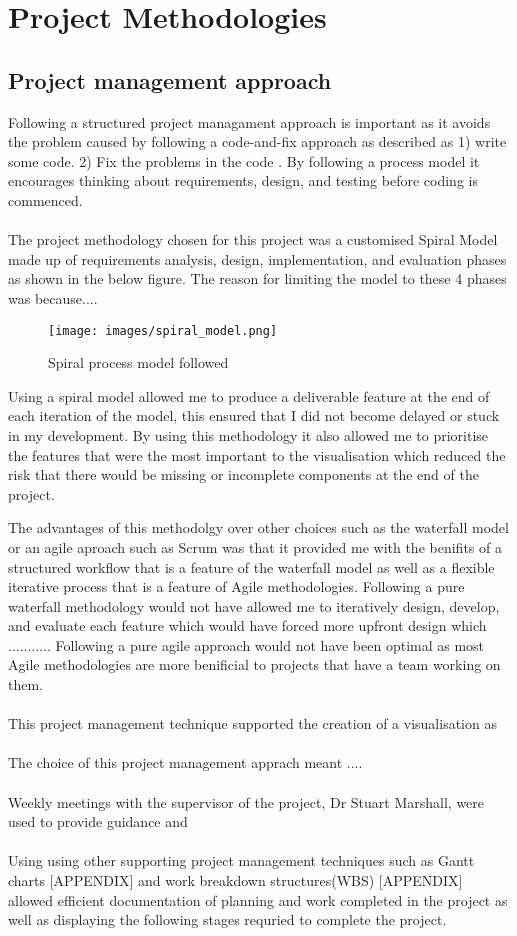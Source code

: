 
\chapter{Project Methodologies}\label{C:m}

\section{Project management approach}
Following a structured project managament approach is important as it avoids the problem caused by following a code-and-fix approach as described  as 1) write some code. 2) Fix the problems in the code \cite{boehm}. By following a process model it encourages thinking about requirements, design, and testing before coding is commenced. 
\\\\
The project methodology chosen for this project was a customised Spiral Model made up of requirements analysis, design, implementation, and evaluation phases as shown in the below figure. The reason for limiting the model to these 4 phases was because....  
\begin{figure}[h!]
  \centering
      \texttt{[image: images/spiral\_model.png]}
  \caption{Spiral process model followed}
\end{figure}
Using a spiral model allowed me to produce a deliverable feature at the end of each iteration of the model, this ensured that I did not become delayed or stuck in my development. By using this methodology it also allowed me to prioritise the features that were the most important to the visualisation which reduced the risk that there would be missing or incomplete components at the end of the project. 

The advantages of this methodolgy over other choices such as the waterfall model or an agile aproach such as Scrum was that it provided me with the benifits of a structured workflow that is a feature of the waterfall model as well as a flexible iterative process that is a feature of Agile methodologies. Following a pure waterfall methodology would not have allowed me to iteratively design, develop, and evaluate each feature which would have forced more upfront design which ........... Following a pure agile approach would not have been optimal as most Agile methodologies are more benificial to projects that have a team working on them. 
\\\\
This project management technique supported the creation of a visualisation as 
\\\\
The choice of this project management apprach meant ....
\\\\
Weekly meetings with the supervisor of the project, Dr Stuart Marshall, were used to provide guidance and 
\\\\
Using using other supporting project management techniques such as Gantt charts [APPENDIX] and work breakdown structures(WBS) [APPENDIX] allowed efficient documentation of planning and work completed in the project as well as displaying the following stages requried to complete the project.

